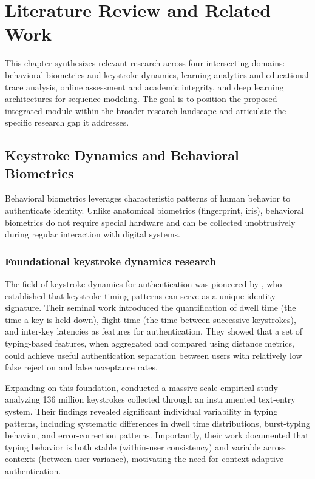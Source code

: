 \chapter{Literature Review and Related Work}
\label{chap:literature}

This chapter synthesizes relevant research across four intersecting domains: behavioral biometrics and keystroke dynamics, learning analytics and educational trace analysis, online assessment and academic integrity, and deep learning architectures for sequence modeling. The goal is to position the proposed integrated module within the broader research landscape and articulate the specific research gap it addresses.

\section{Keystroke Dynamics and Behavioral Biometrics}
\label{sec:keystroke-dynamics}

Behavioral biometrics leverages characteristic patterns of human behavior to authenticate identity. Unlike anatomical biometrics (fingerprint, iris), behavioral biometrics do not require special hardware and can be collected unobtrusively during regular interaction with digital systems.

\subsection{Foundational keystroke dynamics research}

The field of keystroke dynamics for authentication was pioneered by \citet{monrose2000keystroke}, who established that keystroke timing patterns can serve as a unique identity signature. Their seminal work introduced the quantification of dwell time (the time a key is held down), flight time (the time between successive keystrokes), and inter-key latencies as features for authentication. They showed that a set of typing-based features, when aggregated and compared using distance metrics, could achieve useful authentication separation between users with relatively low false rejection and false acceptance rates.

Expanding on this foundation, \citet{dhakal2018observations} conducted a massive-scale empirical study analyzing 136 million keystrokes collected through an instrumented text-entry system. Their findings revealed significant individual variability in typing patterns, including systematic differences in dwell time distributions, burst-typing behavior, and error-correction patterns. Importantly, their work documented that typing behavior is both stable (within-user consistency) and variable across contexts (between-user variance), motivating the need for context-adaptive authentication.

